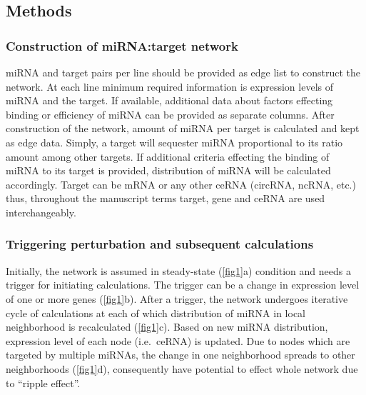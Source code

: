 \documentclass[]{article}
\begin{document}
\hypertarget{methods}{%
\subsection{Methods}\label{methods}}

\hypertarget{construction-of-mirnatarget-network}{%
\subsubsection{Construction of miRNA:target
network}\label{construction-of-mirnatarget-network}}

miRNA and target pairs per line should be provided as edge list to
construct the network. At each line minimum required information is
expression levels of miRNA and the target. If available, additional data
about factors effecting binding or efficiency of miRNA can be provided
as separate columns. After construction of the network, amount of miRNA
per target is calculated and kept as edge data. Simply, a target will
sequester miRNA proportional to its ratio amount among other targets. If
additional criteria effecting the binding of miRNA to its target is
provided, distribution of miRNA will be calculated accordingly. Target
can be mRNA or any other ceRNA (circRNA, ncRNA, etc.) thus, throughout
the manuscript terms target, gene and ceRNA are used interchangeably.

\hypertarget{triggering-perturbation-and-subsequent-calculations}{%
\subsubsection{Triggering perturbation and subsequent
calculations}\label{triggering-perturbation-and-subsequent-calculations}}

Initially, the network is assumed in steady-state (\autoref{fig1}a)
condition and needs a trigger for initiating calculations. The trigger
can be a change in expression level of one or more genes
(\autoref{fig1}b). After a trigger, the network undergoes iterative
cycle of calculations at each of which distribution of miRNA in local
neighborhood is recalculated (\autoref{fig1}c). Based on new miRNA
distribution, expression level of each node (i.e.~ceRNA) is updated. Due
to nodes which are targeted by multiple miRNAs, the change in one
neighborhood spreads to other neighborhoods (\autoref{fig1}d),
consequently have potential to effect whole network due to ``ripple
effect''.
\end{document}
